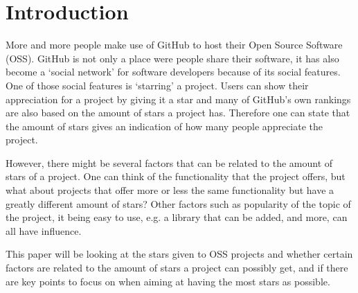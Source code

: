 \section{Introduction}
    More and more people make use of GitHub to host their Open Source Software (OSS)\cite{github-2013}. 
    GitHub is not only a place were people share their software, it has also become a `social network' for software developers because of its social features. \cite{dabbish-2012} 
    One of those social features is `starring' a project. Users can show their appreciation for a project by giving it a  star and many of GitHub's own rankings are also based on the amount of stars a project has.\cite{TODO} %
    Therefore one can state that the amount of stars gives an indication of how many people appreciate the project.
    
    However, there might be several factors that can be related to the amount of stars of a project. 
    One can think of the functionality that the project offers, but what about projects that offer more or less the same functionality but have a greatly different amount of stars? Other factors such as popularity of the topic of the project, it being easy to use, e.g. a library that can be added, and more, can all have influence.
    
    This paper will be looking at the stars given to OSS projects and whether certain factors are related to the amount of stars a project can possibly get, and if there are key points to focus on when aiming at having the most stars as possible.






